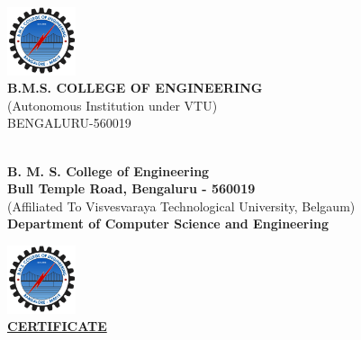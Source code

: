 \begin{titlepage}
    \vspace{1cm}
    
    \includegraphics[width=0.15\textwidth]{bmsce.png} \\
    \vspace{0.5cm}
    {\Large \textbf{B.M.S. COLLEGE OF ENGINEERING}} \\[0.5em]
    {\large (Autonomous Institution under VTU)} \\[0.5em]
    { BENGALURU-560019} \\[0.5em]
    {\academicYear} \\
    

\end{titlepage}

\clearpage


    \begin{center}
    
    {\Large \textbf{B. M. S. College of Engineering}}\\[0.25em]
    {\large \textbf{Bull Temple Road, Bengaluru - 560019}}\\[0.25em]
    
    (Affiliated To Visvesvaraya Technological University, Belgaum)\\[0.25em]
    \textbf{Department of Computer Science and Engineering}
        

    \vspace{0.75cm}
    \includegraphics[width=0.15\textwidth]{bmsce.png}\\
    \vspace{0.75cm}
    \textbf{\Large \underline{CERTIFICATE}}\\
    \vspace{0.5cm}
    \end{center}

